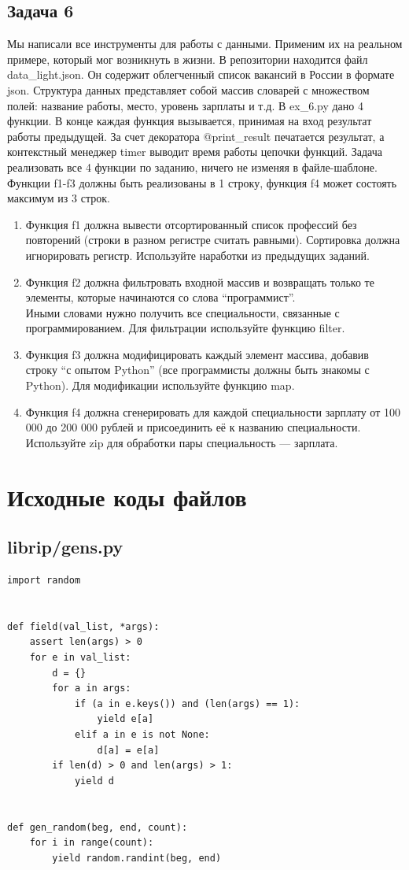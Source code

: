 \documentclass{article}
\begin{document}
\subsection{Задача 6}
Мы написали все инструменты для работы с данными. Применим их на реальном примере, который мог возникнуть в жизни. В репозитории находится файл data\_light.json. Он содержит облегченный список вакансий в России в формате json.
Структура данных представляет собой массив словарей с множеством полей: название работы, место, уровень зарплаты и т.д.
В ex\_6.py дано 4 функции. В конце каждая функция вызывается, принимая на вход результат работы предыдущей. За счет декоратора @print\_result печатается результат, а контекстный менеджер timer выводит время работы цепочки функций.
Задача реализовать все 4 функции по заданию, ничего не изменяя в файле-шаблоне. Функции f1-f3 должны быть реализованы в 1 строку, функция f4 может состоять максимум из 3 строк.

\begin{enumerate}
    \item Функция f1 должна вывести отсортированный список профессий без повторений (строки в разном регистре считать равными). Сортировка должна игнорировать регистр. Используйте наработки из предыдущих заданий.
    \item Функция f2 должна фильтровать входной массив и возвращать только те элементы, которые начинаются со слова “программист”.\\
    Иными словами нужно получить все специальности, связанные с программированием. Для фильтрации используйте функцию filter.
    \item Функция f3 должна модифицировать каждый элемент массива, добавив строку “с опытом Python” (все программисты должны быть знакомы с Python). Для модификации используйте функцию map.
    \item Функция f4 должна сгенерировать для каждой специальности зарплату от 100 000 до 200 000 рублей и присоединить её к названию специальности. Используйте zip для обработки пары специальность — зарплата.
\end{enumerate}
\newpage

\section{Исходные коды файлов}
\subsection{librip/gens.py}
\begin{verbatim}
import random


def field(val_list, *args):
    assert len(args) > 0
    for e in val_list:
        d = {}
        for a in args:
            if (a in e.keys()) and (len(args) == 1):
                yield e[a]
            elif a in e is not None:
                d[a] = e[a]
        if len(d) > 0 and len(args) > 1:
            yield d


def gen_random(beg, end, count):
    for i in range(count):
        yield random.randint(beg, end)

\end{verbatim}
\end{document}
